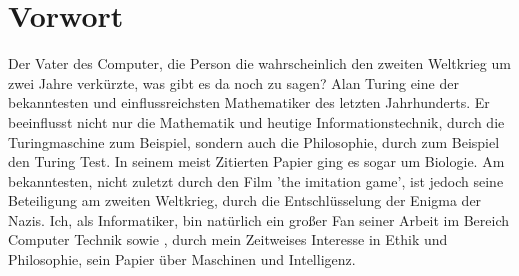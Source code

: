 \section{Vorwort}
Der Vater des Computer, die Person die wahrscheinlich den zweiten Weltkrieg um zwei Jahre verkürzte, was gibt es da noch zu sagen? Alan Turing eine der bekanntesten und einflussreichsten Mathematiker des letzten Jahrhunderts. Er beeinflusst nicht nur die Mathematik und heutige Informationstechnik, durch die Turingmaschine zum Beispiel, sondern auch die Philosophie, durch zum Beispiel den Turing Test. In seinem meist Zitierten Papier ging es sogar um Biologie. Am bekanntesten, nicht zuletzt durch den Film 'the imitation game', ist jedoch seine Beteiligung am zweiten Weltkrieg, durch die Entschlüsselung der Enigma der Nazis. Ich, als Informatiker, bin natürlich ein großer Fan seiner Arbeit im Bereich Computer Technik sowie , durch mein Zeitweises Interesse in Ethik und Philosophie, sein Papier über Maschinen und Intelligenz.